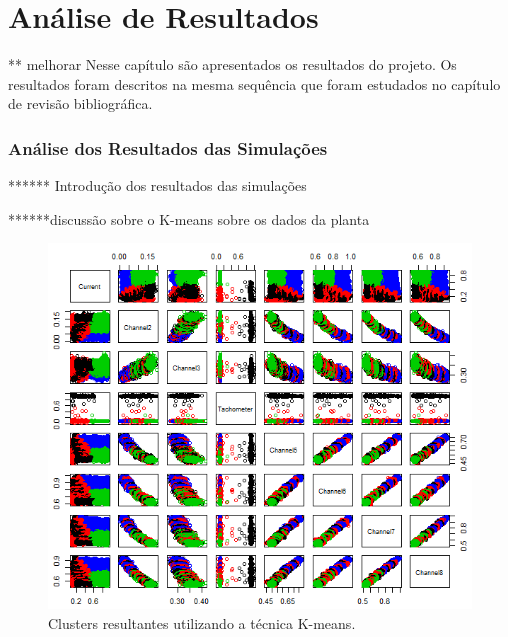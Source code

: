 
\chapter{Análise de Resultados}

** melhorar
Nesse capítulo são apresentados os resultados do projeto. Os resultados 
foram descritos na mesma sequência que foram estudados no capítulo de revisão bibliográfica.


% 

\subsection{Análise dos Resultados das Simulações}

****** Introdução dos resultados das simulações

******discussão sobre o K-means sobre os dados da planta

\begin{figure}[H]
    \caption{Clusters resultantes utilizando a técnica K-means.}
    \begin{center}
        \includegraphics[scale=.65]{resultados/img/kmeans2.png}
    \end{center}
    \label{fig:kmeans2}
\end{figure}

